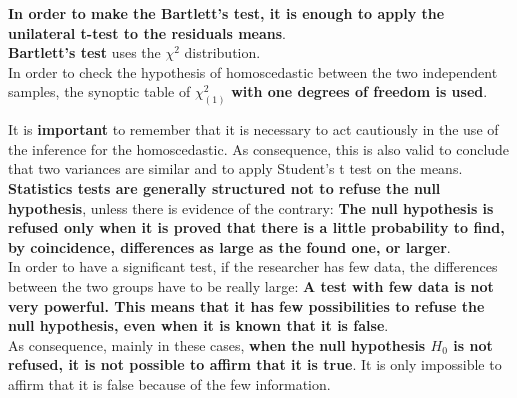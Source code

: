 
\begin{frame}
  \vspace*{.25cm}
  \textbf{In order to make the Bartlett's test, it is enough to apply the unilateral t-test to the residuals means}.\\
  \vspace*{1.25cm}
  \textbf{Bartlett's test} uses the $\chi^2$ distribution.\\
  \vspace*{.25cm}
  In order to check the hypothesis of homoscedastic between the two independent samples, the synoptic table of $ \chi^2_{(1)} $ \textbf{with one degrees of freedom is used}. 
\end{frame}

\begin{frame}
  \begin{small}
    \vspace*{.25cm}
    It is \textbf{important} to remember that it is necessary to act cautiously in the use of the inference for the homoscedastic. As consequence, this is also valid to conclude that two variances are similar and to apply Student's t test on the means.\\
    \textbf{Statistics tests are generally structured not to refuse the null hypothesis}, unless there is evidence of the contrary: \textbf{The null hypothesis is refused only when it is proved that there is a little probability to find, by coincidence, differences as large as the found one, or larger}.\\
    \vspace*{.25cm}
    In order to have a significant test, if the researcher has few data, the differences between the two groups have to be really large: \textbf{A test with few data is not very powerful. This means that it has few possibilities to refuse the null hypothesis, even when it is known that it is false}.\\
    \vspace*{.25cm}
    As consequence, mainly in these cases, \textbf{ when the null hypothesis {\boldmath $ H_0 $} is not refused, it is not possible to affirm that it is true}. It is only impossible to affirm that it is false because of the few information.
  \end{small}
\end{frame}

